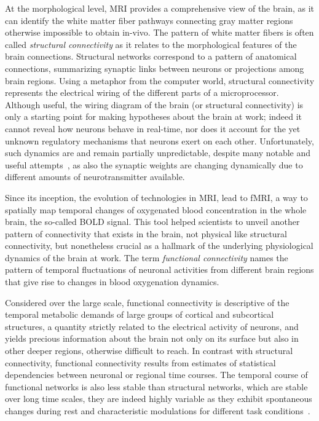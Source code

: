 At the morphological level, MRI provides a comprehensive view of the brain, as it can identify the white matter fiber pathways connecting gray matter regions otherwise impossible to obtain in-vivo. The pattern of white matter fibers is often called \emph{structural connectivity} as it relates to the morphological features of the brain connections. Structural networks correspond to a pattern of anatomical connections, summarizing synaptic links between neurons or projections among brain regions. Using a metaphor from the computer world, structural connectivity represents the electrical wiring of the different parts of a microprocessor. Although useful, the wiring diagram of the brain (or structural connectivity) is only a starting point for making hypotheses about the brain at work; indeed it cannot reveal how neurons behave in real-time, nor does it account for the yet unknown regulatory mechanisms that neurons exert on each other. Unfortunately, such dynamics are and remain partially unpredictable, despite many notable and useful attempts~\cite{deco2008}, as also the synaptic weights are changing dynamically due to different amounts of neurotransmitter available.

Since its inception, the evolution of technologies in MRI, lead to fMRI, a way to spatially map temporal changes of oxygenated blood concentration in the whole brain, the so-called BOLD signal. This tool helped scientists to unveil another pattern of connectivity that exists in the brain, not physical like structural connectivity, but nonetheless crucial as a hallmark of the underlying physiological dynamics of the brain at work.
The term \emph{functional connectivity} names the pattern of temporal fluctuations of neuronal activities from different brain regions that give rise to changes in blood oxygenation dynamics.

Considered over the large scale, functional connectivity is descriptive of the temporal metabolic demands of large groups of cortical and subcortical structures, a quantity strictly related to the electrical activity of neurons, and yields precious information about the brain not only on its surface but also in other deeper regions, otherwise difficult to reach. In contrast with structural connectivity, functional connectivity results from estimates of statistical dependencies between neuronal or regional time courses. The temporal course of functional networks is also less stable than structural networks, which are stable over long time scales, they are indeed highly variable as they exhibit spontaneous changes during rest and characteristic modulations for different task conditions~\cite{honey2007,hutchison2013}.

